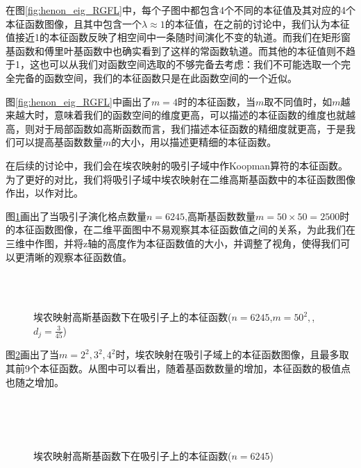 在图\ref{fig:henon_eig_RGFL}中，每个子图中都包含4个不同的本征值及其对应的4个本征函数图像，且其中包含一个$\lambda\approx 1$的本征值，在之前的讨论中，我们认为本征值接近1的本征函数反映了相空间中一条随时间演化不变的轨道。而我们在矩形窗基函数和傅里叶基函数中也确实看到了这样的常函数轨道。而其他的本征值则不趋于1，这也可以从我们对函数空间选取的不够完备去考虑：我们不可能选取一个完全完备的函数空间，我们的本征函数只是在此函数空间的一个近似。

图\ref{fig:henon_eig_RGFL}中画出了$m=4$时的本征函数，当$m$取不同值时，如$m$越来越大时，意味着我们的函数空间的维度更高，可以描述的本征函数的维度也就越高，则对于局部函数如高斯函数而言，我们描述本征函数的精细度就更高，于是我们可以提高基函数数量$m$的大小，用以描述更精细的本征函数。

在后续的讨论中，我们会在埃农映射的吸引子域中作Koopman算符的本征函数。为了更好的对比，我们将吸引子域中埃农映射在二维高斯基函数中的本征函数图像作出，以作对比。

图\ref{fig:Henon_eigen_Gauss_attr_n6245m50md45}画出了当吸引子演化格点数量$n=6245$,高斯基函数数量$m=50\times 50=2500$时的本征函数图像，在二维平面图中不易观察其本征函数值之间的关系，为此我们在三维中作图，并将z轴的高度作为本征函数值的大小，并调整了视角，使得我们可以更清晰的观察本征函数值。
\begin{figure}
  \centering
  \\
  \\
  \caption[埃农映射高斯基函数下在吸引子上的本征函数]{埃农映射高斯基函数下在吸引子上的本征函数($n=6245$,$m=50^2,$,$d_j=\frac{3}{45}$)}\label{fig:Henon_eigen_Gauss_attr_n6245m50md45}
\end{figure}

图\ref{fig:Henon_eigen_Gauss_attr_leftU_n6245m2}画出了当$m=2^2,3^2,4^2$时，埃农映射在吸引子域上的本征函数图像，且最多取其前9个本征函数。从图中可以看出，随着基函数数量的增加，本征函数的极值点也随之增加。
\begin{figure}
  \centering
  \\
  \\
  \\
  \caption{埃农映射高斯基函数下在吸引子上的本征函数($n=6245$)}\label{fig:Henon_eigen_Gauss_attr_leftU_n6245m2}
\end{figure}

